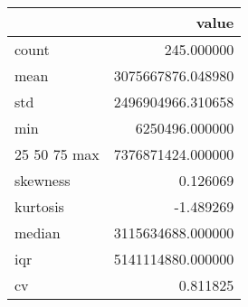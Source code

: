 \begin{tabular}{lr}
\toprule
 & value \\
\midrule
count & 245.000000 \\
mean & 3075667876.048980 \\
std & 2496904966.310658 \\
min & 6250496.000000 \\
25%
50%
75%
max & 7376871424.000000 \\
skewness & 0.126069 \\
kurtosis & -1.489269 \\
median & 3115634688.000000 \\
iqr & 5141114880.000000 \\
cv & 0.811825 \\
\bottomrule
\end{tabular}
